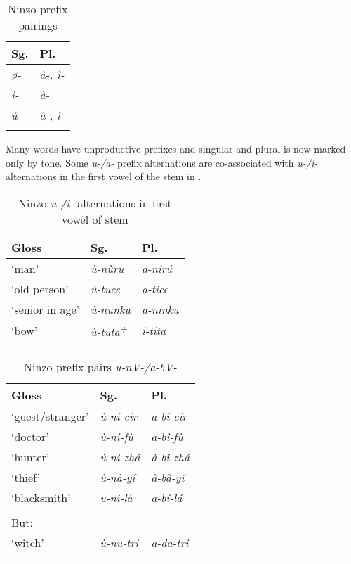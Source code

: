 \documentclass[output=paper]{langsci/langscibook}
\begin{document}
\begin{table}%
\caption{Ninzo prefix pairings}
    \label{extab:nomaffplat:35} 
\begin{tabularx}{\textwidth}{XX}
\lsptoprule 
{Sg.} 	& {Pl.}\\
\midrule
\itshape ø- 	& \itshape à-, ì-\\
\itshape i- 	& \itshape à-\\
\itshape ù- 	& \itshape à-, ì-\\
\lspbottomrule
\end{tabularx}
\end{table}


Many words have unproductive prefixes and singular and plural is now marked only by tone. Some \textit{u-/a-} prefix alternations are co-associated with \textit{u-/i-} alternations in the first vowel of the stem in .

\begin{table}
\caption{Ninzo \textit{u-/i-} alternations in first vowel of stem} 
\label{extab:nomaffplat:36}
\begin{tabularx}{\textwidth}{XXl}
\lsptoprule
Gloss 	& {Sg.} 	& {Pl.}\\
\midrule
‘man’ 	&  \itshape ù-nùru 	&  \itshape a-nirú\\
‘old person’ 	&  \itshape ù-tuce 	&  \itshape a-tice\\
‘senior in age’ 	&  \itshape ù-nunku 	&  \itshape a-ninku\\
‘bow’ 	&  \textit{ù-tuta\textsuperscript{+}} 	&  \itshape i-tita\\
 \lspbottomrule
\end{tabularx}
\end{table}



\begin{table}
\caption{Ninzo prefix pairs \textit{u-nV-/a-bV-} } 
\label{extab:nomaffplat:37}
\begin{tabularx}{\textwidth}{XXl}
 \lsptoprule
Gloss 	& {Sg.} 	& {Pl.}\\
\midrule
‘guest/stranger’ 	&  \itshape ù-ni-cir 	&  \itshape a-bi-cir\\
‘doctor’ 	&  \itshape ù-ni-fù 	&  \itshape a-bi-fù\\
‘hunter’ 	&  \itshape ù-nì-zhá 	&  \itshape à-bì-zhá\\
‘thief’ 	&  \itshape ù-nà-yí 	&  \itshape à-bà-yí\\
‘blacksmith’ 	&  \itshape u-nì-là 	&  \itshape a-bí-lá\\
	&  	& \\
But: 	&  	& \\
‘witch’ 	&  \itshape ù-nu-tri 	&  \itshape a-da-tri\\
\lspbottomrule
\end{tabularx}
\end{table}
\end{document}
